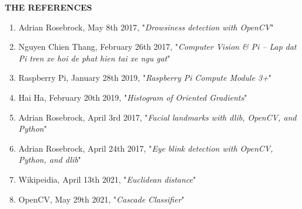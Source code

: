 \documentclass[a4paper,13pt]{report}
\begin{document}
    

    

    

    

    

    \newpage
    \thispagestyle{plain}
    \begin{center}
        \Huge{\textbf{THE REFERENCES}}
    \end{center}
    \vspace{3mm}
    \begin{enumerate}
        \item Adrian Rosebrock, May 8th 2017, "\textit{Drowsiness detection with OpenCV}"
        \item Nguyen Chien Thang, February 26th 2017, "\textit{Computer Vision \& Pi – Lap dat Pi tren xe hoi de phat hien tai xe ngu gat}"
        \item Raspberry Pi, January 28th 2019, "\textit{Raspberry Pi Compute Module 3+}"
        \item Hai Ha, February 20th 2019, "\textit{Histogram of Oriented Gradients}"
        \item Adrian Rosebrock, April 3rd 2017, "\textit{Facial landmarks with dlib, OpenCV, and Python}"
        \item Adrian Rosebrock, April 24th 2017, "\textit{Eye blink detection with OpenCV, Python, and dlib}"
        \item Wikipeidia, April 13th 2021, "\textit{Euclidean distance}"
        \item OpenCV, May 29th 2021, "\textit{Cascade Classifier}"
    \end{enumerate}

    
\end{document}
